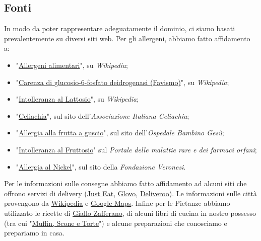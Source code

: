 \documentclass[12pt]{article}
\begin{document}
\subsection{Fonti}
In modo da poter rappresentare adeguatamente il dominio, ci siamo basati prevalentemente su diversi siti web.\newline
Per gli allergeni, abbiamo fatto affidamento a:
\begin{itemize}
    \item "\href{https://it.wikipedia.org/wiki/Allergeni_alimentari}{Allergeni alimentari}", su \textit{Wikipedia};
    \item "\href{https://it.wikipedia.org/wiki/Carenza_di_glucosio-6-fosfato_deidrogenasi}{Carenza di glucosio-6-fosfato deidrogenasi (Favismo)}", su \textit{Wikipedia};
    \item "\href{https://it.wikipedia.org/wiki/Intolleranza_al_lattosio}{Intolleranza al Lattosio}", su \textit{Wikipedia};
    \item "\href{https://www.celiachia.it/}{Celiachia}", sul sito dell'\textit{Associazione Italiana Celiachia};
    \item "\href{http://www.ospedalebambinogesu.it/allergia-alla-frutta-a-guscio}{Allergia alla frutta a guscio}", sul sito dell'\textit{Ospedale Bambino Gesù};
    \item "\href{https://www.orpha.net/consor/cgi-bin/OC_Exp.php?lng=it&Expert=469}{Intolleranza al Fruttosio}" sul \textit{Portale delle malattie rare e dei farmaci orfani};
    \item "\href{https://www.fondazioneveronesi.it/magazine/articoli/lesperto-risponde/allergia-al-nichel-quali-precauzioni-prendere-cucina}{Allergia al Nickel}", sul sito della \textit{Fondazione Veronesi}.
\end{itemize}
Per le informazioni sulle consegne abbiamo fatto affidamento ad alcuni siti che offrono servizi di delivery (\href{https://www.justeat.it/}{Just Eat}, \href{https://glovoapp.com}{Glovo}, \href{https://deliveroo.it}{Deliveroo}).\newline
Le informazioni sulle città provengono da \href{https://it.wikipedia.org/}{Wikipedia} e \href{https://www.google.it/maps}{Google Maps}.\newline
Infine per le Pietanze abbiamo utilizzato le ricette di \href{https://www.giallozafferano.it/}{Giallo Zafferano}, di alcuni libri di cucina in nostro possesso (tra cui "\href{https://www.anobii.com/books/Muffin_scone_e_torte/9788880584278/01119011f24adbf79a}{Muffin, Scone e Torte}") e alcune preparazioni che conosciamo e prepariamo in casa.
\end{document}
